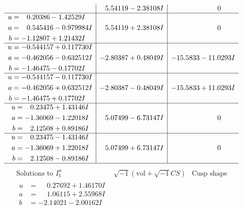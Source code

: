 \documentclass[1p]{elsarticle_modified}
\theoremstyle{definition}
\newcommand{\I}{\sqrt{-1}}
\begin{document}
$$\begin{array}{c|c|c}
 & \phantom{-}5.54119 - 2.38108 I & \phantom{-0.000000 } 0 \\ \hline\begin{aligned}
u &= \phantom{-}0.20386 - 1.42529 I \\
a &= \phantom{-}0.545416 - 0.979984 I \\
b &= -1.12807 + 1.21432 I\end{aligned}
 & \phantom{-}5.54119 + 2.38108 I & \phantom{-0.000000 } 0 \\ \hline\begin{aligned}
u &= -0.544157 + 0.117730 I \\
a &= -0.462056 - 0.632512 I \\
b &= -1.46475 - 0.17702 I\end{aligned}
 & -2.80387 + 0.48049 I & -15.5833 - 11.0293 I \\ \hline\begin{aligned}
u &= -0.544157 - 0.117730 I \\
a &= -0.462056 + 0.632512 I \\
b &= -1.46475 + 0.17702 I\end{aligned}
 & -2.80387 - 0.48049 I & -15.5833 + 11.0293 I \\ \hline\begin{aligned}
u &= \phantom{-}0.23475 + 1.43146 I \\
a &= -1.36069 - 1.22018 I \\
b &= \phantom{-}2.12508 + 0.89186 I\end{aligned}
 & \phantom{-}5.07499 - 6.73147 I & \phantom{-0.000000 } 0 \\ \hline\begin{aligned}
u &= \phantom{-}0.23475 - 1.43146 I \\
a &= -1.36069 + 1.22018 I \\
b &= \phantom{-}2.12508 - 0.89186 I\end{aligned}
 & \phantom{-}5.07499 + 6.73147 I & \phantom{-0.000000 } 0\\
 \hline 
 \end{array}$$\newpage$$\begin{array}{c|c|c}  
\text{Solutions to }I^u_{1}& \I (\text{vol} + \sqrt{-1}CS) & \text{Cusp shape}\\
 \hline 
\begin{aligned}
u &= \phantom{-}0.27692 + 1.46170 I \\
a &= \phantom{-}1.06115 + 2.55968 I \\
b &= -2.14021 - 2.00162 I\end{aligned}

\end{array}$$
\end{document}
